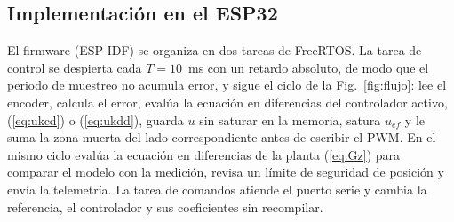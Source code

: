 \documentclass[conference]{IEEEtran}
\begin{document}
\subsection{Implementación en el ESP32}
El firmware (ESP-IDF) se organiza en dos tareas de FreeRTOS. La tarea de
control se despierta cada $T = 10$~ms con un retardo absoluto, de modo que el
periodo de muestreo no acumula error, y sigue el ciclo de la
Fig.~\ref{fig:flujo}: lee el encoder, calcula el error, evalúa la ecuación en
diferencias del controlador activo, (\ref{eq:ukcd}) o (\ref{eq:ukdd}), guarda
$u$ sin saturar en la memoria, satura $u_{ef}$ y le suma la zona muerta del
lado correspondiente antes de escribir el PWM. En el mismo ciclo evalúa la
ecuación en diferencias de la planta (\ref{eq:Gz}) para comparar el modelo
con la medición, revisa un límite de seguridad de posición y envía la
telemetría. La tarea de comandos atiende el puerto serie y cambia la
referencia, el controlador y sus coeficientes sin recompilar.
\end{document}
